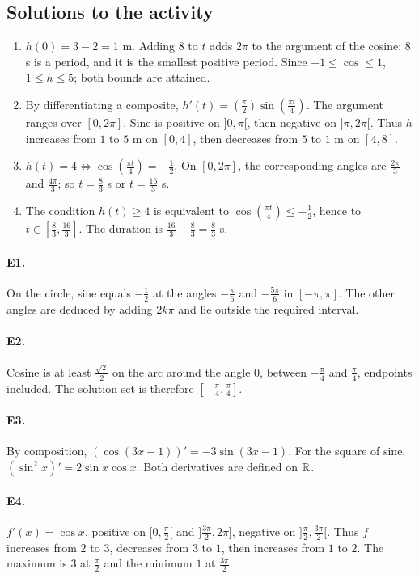 \subsection{Solutions to the activity}\begin{enumerate}
\item $h(0)=3-2=1$ m. Adding $8$ to $t$ adds $2\pi$ to the argument of the cosine: $8$ s is a period, and it is the smallest positive period. Since $-1\le\cos\le1$, $1\le h\le5$; both bounds are attained.
\item By differentiating a composite, $h'(t)=(\frac{\pi}{2})\sin (\frac{\pi t}{4})$. The argument ranges over $[0,2\pi]$. Sine is positive on $]0,\pi[$, then negative on $]\pi,2\pi[$. Thus $h$ increases from $1$ to $5$ m on $[0,4]$, then decreases from $5$ to $1$ m on $[4,8]$.
\item $h(t)=4\Longleftrightarrow\cos (\frac{\pi t}{4})=-\frac{1}{2}$. On $[0,2\pi]$, the corresponding angles are $\frac{2\pi}{3}$ and $\frac{4\pi}{3}$; so $t=\frac{8}{3}$ s or $t=\frac{16}{3}$ s.
\item The condition $h(t)\ge4$ is equivalent to $\cos (\frac{\pi t}{4})\le-\frac{1}{2}$, hence to $t\in[\frac{8}{3},\frac{16}{3}]$. The duration is $\frac{16}{3}-\frac{8}{3}=\frac{8}{3}$ s.
\end{enumerate}

\paragraph{E1.}On the circle, sine equals $-\frac{1}{2}$ at the angles $-\frac{\pi}{6}$ and $-\frac{5\pi}{6}$ in $[-\pi,\pi]$. The other angles are deduced by adding $2k\pi$ and lie outside the required interval.

\paragraph{E2.}Cosine is at least $\frac{\sqrt{2}}{2}$ on the arc around the angle $0$, between $-\frac{\pi}{4}$ and $\frac{\pi}{4}$, endpoints included. The solution set is therefore $[-\frac{\pi}{4},\frac{\pi}{4}]$.

\paragraph{E3.}By composition, $(\cos(3x-1))'=-3\sin(3x-1)$. For the square of sine, $(\sin^2x)'=2\sin x\cos x$. Both derivatives are defined on $\mathbb R$.

\paragraph{E4.}$f'(x)=\cos x$, positive on $[0,\frac{\pi}{2}[$ and $]\frac{3\pi}{2},2\pi]$, negative on $]\frac{\pi}{2},\frac{3\pi}{2}[$. Thus $f$ increases from $2$ to $3$, decreases from $3$ to $1$, then increases from $1$ to $2$. The maximum is $3$ at $\frac{\pi}{2}$ and the minimum $1$ at $\frac{3\pi}{2}$.

